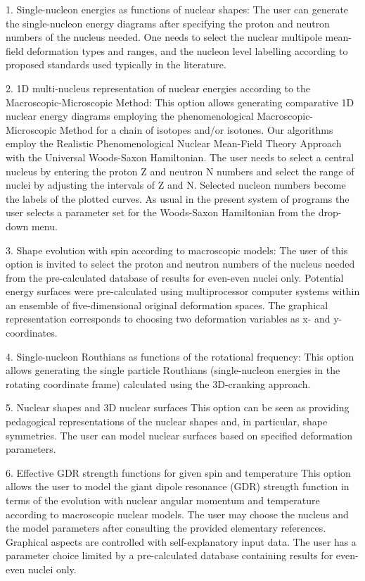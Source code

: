 1. Single-nucleon energies as functions of nuclear shapes: 
The user can generate the single-nucleon energy diagrams after specifying the proton and neutron numbers of the nucleus needed. One needs to select the nuclear multipole mean-field deformation types and ranges, and the nucleon level labelling according to proposed standards used typically in the literature.

2. 1D multi-nucleus representation of nuclear energies according to the Macroscopic-Microscopic Method:
This option allows generating comparative 1D nuclear energy diagrams employing the phenomenological Macroscopic-Microscopic Method for a chain of isotopes and/or isotones. Our algorithms employ the Realistic Phenomenological Nuclear Mean-Field Theory Approach with the Universal Woods-Saxon Hamiltonian. The user needs to select a central nucleus by entering the proton Z and neutron N numbers and select the range of nuclei by adjusting the intervals of Z and N. Selected nucleon numbers become the labels of the plotted curves. As usual in the present system of programs the user selects a parameter set for the Woods-Saxon Hamiltonian from the drop-down menu.

3. Shape evolution with spin according to macroscopic models:
The user of this option is invited to select the proton and neutron numbers of the nucleus needed from the pre-calculated database of results for even-even nuclei only. Potential energy surfaces were pre-calculated using multiprocessor computer systems within an ensemble of five-dimensional original deformation spaces. The graphical representation corresponds to choosing two deformation variables as x- and y-coordinates.

4. Single-nucleon Routhians as functions of the rotational frequency:
This option allows generating the single particle Routhians (single-nucleon energies in the rotating coordinate frame) calculated using the 3D-cranking approach.

5. Nuclear shapes and 3D nuclear surfaces
This option can be seen as providing pedagogical representations of the nuclear shapes and, in particular, shape symmetries. The user can model nuclear surfaces based on specified deformation parameters.

6. Effective GDR strength functions for given spin and temperature
This option allows the user to model the giant dipole resonance (GDR) strength function in terms of the evolution with nuclear angular momentum and temperature according to macroscopic nuclear models. The user may choose the nucleus and the model parameters after consulting the provided elementary references. Graphical aspects are controlled with self-explanatory input data. The user has a parameter choice limited by a pre-calculated database containing results for even-even nuclei only.

